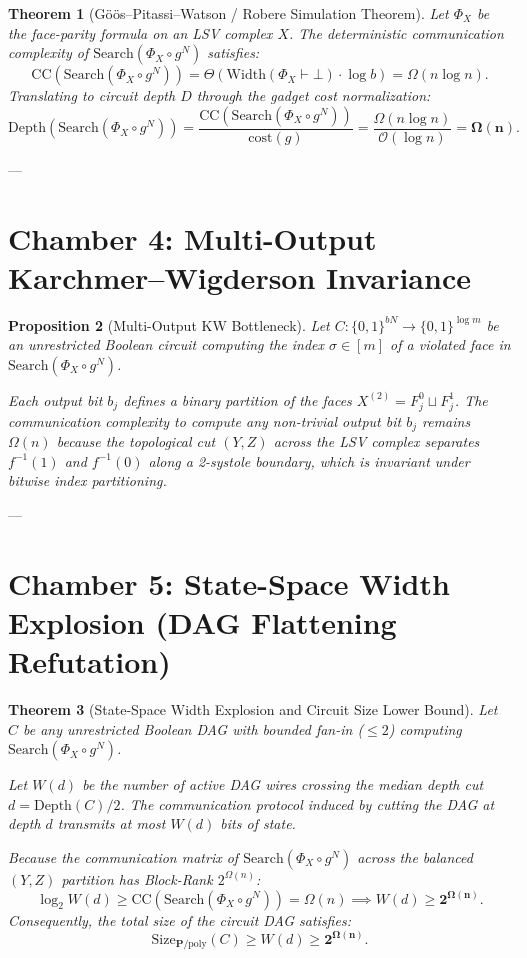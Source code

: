 \documentclass[11pt,a4paper]{article}
\theoremstyle{plain}
\newtheorem{theorem}{Theorem}[section]
\newtheorem{proposition}[theorem]{Proposition}
\theoremstyle{definition}
\theoremstyle{remark}
\newcommand{\Width}{\mathrm{Width}}
\newcommand{\Size}{\mathrm{Size}}
\newcommand{\Depth}{\mathrm{Depth}}
\newcommand{\CC}{\mathrm{CC}}
\newcommand{\Search}{\mathrm{Search}}
\begin{document}
\begin{theorem}[Göös--Pitassi--Watson / Robere Simulation Theorem]\label{thm:gpw_lifting}
Let $\Phi_X$ be the face-parity formula on an LSV complex $X$. The deterministic communication complexity of $\Search(\Phi_X \circ g^N)$ satisfies:
\[
\CC(\Search(\Phi_X \circ g^N)) = \Theta\left( \Width(\Phi_X \vdash \bot) \cdot \log b \right) = \Omega(n \log n).
\]
Translating to circuit depth $D$ through the gadget cost normalization:
\[
\Depth(\Search(\Phi_X \circ g^N)) = \frac{\CC(\Search(\Phi_X \circ g^N))}{\mathrm{cost}(g)} = \frac{\Omega(n \log n)}{\mathcal{O}(\log n)} = \mathbf{\Omega(n)}.
\]
\end{theorem}

---

\section{Chamber 4: Multi-Output Karchmer--Wigderson Invariance}

\begin{proposition}[Multi-Output KW Bottleneck]\label{prop:multi_output_kw}
Let $C: \{0,1\}^{bN} \to \{0,1\}^{\log m}$ be an unrestricted Boolean circuit computing the index $\sigma \in [m]$ of a violated face in $\Search(\Phi_X \circ g^N)$. 

Each output bit $b_j$ defines a binary partition of the faces $X^{(2)} = F_j^0 \sqcup F_j^1$. The communication complexity to compute any non-trivial output bit $b_j$ remains $\Omega(n)$ because the topological cut $(Y, Z)$ across the LSV complex separates $f^{-1}(1)$ and $f^{-1}(0)$ along a 2-systole boundary, which is invariant under bitwise index partitioning.
\end{proposition}

---

\section{Chamber 5: State-Space Width Explosion (DAG Flattening Refutation)}

\begin{theorem}[State-Space Width Explosion and Circuit Size Lower Bound]\label{thm:width_explosion}
Let $C$ be any unrestricted Boolean DAG with bounded fan-in ($\le 2$) computing $\Search(\Phi_X \circ g^N)$. 

Let $W(d)$ be the number of active DAG wires crossing the median depth cut $d = \Depth(C)/2$. The communication protocol induced by cutting the DAG at depth $d$ transmits at most $W(d)$ bits of state. 

Because the communication matrix of $\Search(\Phi_X \circ g^N)$ across the balanced $(Y, Z)$ partition has Block-Rank $2^{\Omega(n)}$:
\[
\log_2 W(d) \ge \CC(\Search(\Phi_X \circ g^N)) = \Omega(n) \implies W(d) \ge \mathbf{2^{\Omega(n)}}.
\]
Consequently, the total size of the circuit DAG satisfies:
\[
\Size_{\mathbf{P}/\mathrm{poly}}(C) \ge W(d) \ge \mathbf{2^{\Omega(n)}}.
\]
\end{theorem}
\end{document}
